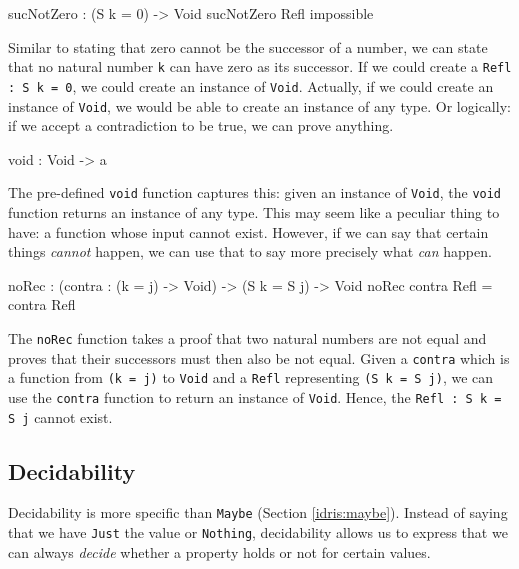        \begin{code}[label={idr:snz}, caption={The successor of a natural number cannot be zero}]
        sucNotZero : (S k = 0) -> Void
        sucNotZero Refl impossible
        \end{code}
        Similar to stating that zero cannot be the successor of a number, we can state that no natural number \texttt{k} can have zero as its successor. If we could create a\linebreak
        \texttt{Refl : S k = 0}, we could create an instance of \texttt{Void}. Actually, if we could create an instance of \texttt{Void}, we would be able to create an instance of any type. Or logically: if we accept a contradiction to be true, we can prove anything.
    
    
        \begin{code}[caption={The \texttt{void} function}]
        void : Void -> a
        \end{code}
    
        The pre-defined \texttt{void} function captures this: given an instance of \texttt{Void}, the \texttt{void} function returns an instance of any type. This may seem like a peculiar thing to have: a function whose input cannot exist. However, if we can say that certain things \textit{cannot} happen, we can use that to say more precisely what \textit{can} happen.
        
        \begin{code}[label={des:no-rec}, caption={Applying a function to an impossibility does not make it possible}]
        noRec : (contra : (k = j) -> Void) -> (S k = S j) -> Void
        noRec contra Refl = contra Refl
        \end{code}
        
        The \texttt{noRec} function takes a proof that two natural numbers are not equal and proves that their successors must then also be not equal. Given a \texttt{contra} which is a function from \texttt{(k = j)} to \texttt{Void} and a \texttt{Refl} representing\linebreak
        \texttt{(S k = S j)}, we can use the \texttt{contra} function to return an instance of \texttt{Void}. Hence, the
        \texttt{Refl : S k = S j} cannot exist.
    
    \subsection{Decidability}
        Decidability is more specific than \texttt{Maybe} (Section \ref{idris:maybe}). Instead of saying that we have \texttt{Just} the value or \texttt{Nothing}, decidability allows us to express that we can always \textit{decide} whether a property holds or not for certain values.
    
